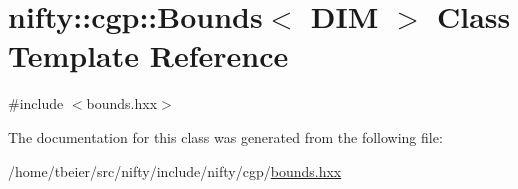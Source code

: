 \hypertarget{classnifty_1_1cgp_1_1Bounds}{}\section{nifty\+:\+:cgp\+:\+:Bounds$<$ D\+I\+M $>$ Class Template Reference}
\label{classnifty_1_1cgp_1_1Bounds}


{\ttfamily \#include $<$bounds.\+hxx$>$}



The documentation for this class was generated from the following file\+:\begin{DoxyCompactItemize}
\item 
/home/tbeier/src/nifty/include/nifty/cgp/\hyperlink{bounds_8hxx}{bounds.\+hxx}\end{DoxyCompactItemize}
